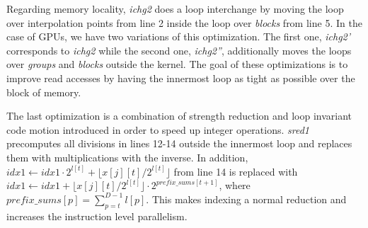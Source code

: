 Regarding memory locality, \textit{ichg2} does a loop interchange by moving the
loop over interpolation points from line 2 inside the loop over \textit{blocks}
from line 5. In the case of GPUs, we have two variations of this optimization.
The first one, \textit{ichg2'} corresponds to \textit{ichg2} while the second
one, \textit{ichg2''}, additionally moves the loops over \textit{groups}
and \textit{blocks} outside the kernel. The goal of these optimizations is to
improve read accesses by having the innermost loop as tight as possible over the
block of memory.

The last optimization is a combination of strength reduction and loop invariant
code motion introduced in order to speed up integer operations. \textit{sred1}
precomputes all divisions in lines 12-14 outside the innermost loop and replaces
them with multiplications with the inverse. In addition, $idx1 \leftarrow
idx1 \cdot 2^{l[t]} + \lfloor x[j][t] / 2^{l[t]} \rfloor$ from line 14 is
replaced with $idx1 \leftarrow idx1 + \lfloor x[j][t] / 2^{l[t]} \rfloor
\cdot 2^{prefix\_sums[t + 1]}$, where $prefix\_sums[p] = \sum_{p=t}^{D-1}l[p]$.
This makes indexing a normal reduction and increases the instruction level
parallelism.
% 
% 
